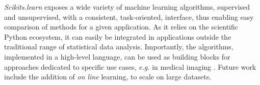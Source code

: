 \documentclass[twoside,11pt]{article}
\begin{document}
\emph{Scikits.learn} exposes a wide variety of machine learning
algorithms, supervised and unsupervised, with a consistent,
task-oriented, interface, thus enabling easy comparison of methods for a
given application.
%
As it relies on the scientific Python ecosystem, it can easily be
integrated in applications outside the traditional range of statistical
data analysis. Importantly, the algorithms, implemented in a high-level
language, can be used as building blocks for approaches dedicated to
specific use cases, \emph{e.g.} in medical imaging \citep{Michel2011}.
%
Future work include the addition of \emph{on line} learning, to scale on
large datasets.


\end{document}
